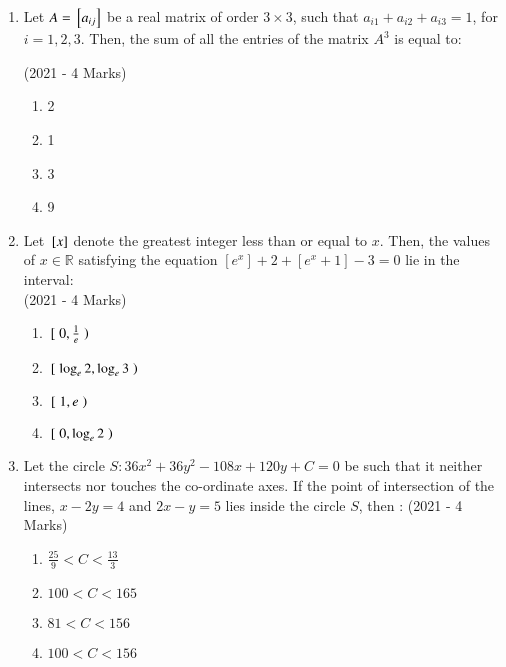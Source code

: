 \documentclass[journal]{IEEEtran}
\begin{document}
\begin{enumerate}
{        }
    \item{
        	Let $A={}\left[a_{ij}\right]$ be a real matrix of order $3 \times 3$, such that $a_{i1}+a_{i2}+a_{i3}=1$, for $i=1,2,3$. Then, the sum of all the entries of the matrix $A^3$ is equal to:
        	
             \text{   }\hfill
                {(2021 - 4 Marks)}
				\begin{multicols}{4}
	                \begin{enumerate}
	                   	\item 2
	                   	\item 1
	                   	\item 3
	                   	\item 9
	                \end{enumerate}
				\end{multicols}
        
        }
 \item{
    	
	    	Let ${}\left[x\right]$ denote the greatest integer less than or equal to $x$. Then, the values of $x \in \mathbb{R}$ satisfying the equation $[e^x] + 2 + [e^{x}+1] - 3 = 0$ lie in the interval:\\
	    	\text{   }\hfill
	    	{(2021 - 4 Marks)}
	    	\begin{multicols}{4}
	    		\begin{enumerate}
	    			\item ${}\left[\right.0, \frac{1}{e}\left.\right)$
	    			\item ${}\left[\right. \log_e{2}, \log_e{3}\left.\right)$
	    			\item ${}\left[\right.1, e\left.\right)$
	    			\item ${}\left[\right.0, \log_e{2}\left.\right)$
	    		\end{enumerate}
	    	\end{multicols}
	    	
	    }
    \item{
	
		    Let the circle $S: 36x^2 + 36y^2 - 108x + 120y + C = 0$ be such that it neither intersects nor touches the
		    co-ordinate axes. If the point of intersection of the lines, $x - 2y = 4$ and $2x - y = 5$ lies inside the
		    circle $S$, then :
			\text{   }\hfill
			{(2021 - 4 Marks)}
			\begin{multicols}{4}
				\begin{enumerate}
						\item $\frac{25}{9} < C < \frac{13}{3}$
						\item $100 < C < 165$
						\item $ 81 < C < 156$
						\item $100 < C < 156$
				\end{enumerate}
			\end{multicols}
			
}
\end{enumerate}
\end{document}
